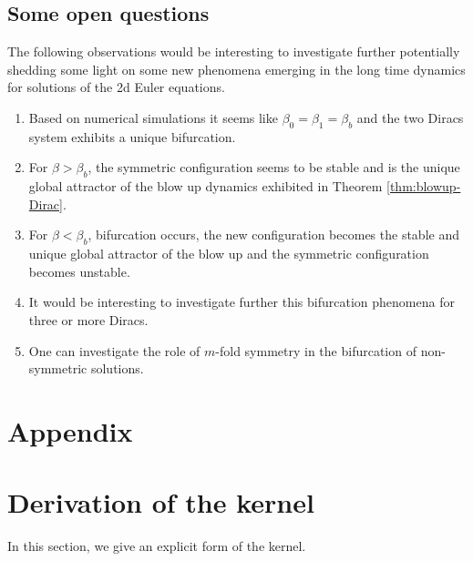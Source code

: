 \documentclass[10pt]{article}
\theoremstyle{definition}
\theoremstyle{remark}
\numberwithin{equation}{section}
\newcommand{\0}{\emptyset}
\begin{document}
\subsection{Some open questions}
The following observations would be interesting to investigate further potentially shedding some light on some new phenomena emerging in the long time dynamics for solutions of the 2d Euler equations.
\begin{enumerate}
    \item Based on numerical simulations it seems like $\beta_0=\beta_1=\beta_b$ and the two Diracs system exhibits a unique bifurcation.
    \item For $\beta> \beta_b$, the symmetric configuration seems to be stable and is the unique global attractor of the blow up dynamics exhibited in Theorem \ref{thm:blowup-Dirac}.
    \item For $\beta< \beta_b$, bifurcation occurs, the new configuration becomes the stable and unique global attractor of the blow up and the symmetric configuration becomes unstable.
    \item It would be interesting to investigate further this bifurcation phenomena for three or more Diracs. 
    \item One can investigate the role of $m$-fold symmetry in the bifurcation of non-symmetric solutions. 
\end{enumerate}
	
	\appendix
	
	
	\section*{Appendix}
	\section{Derivation of the kernel}

        In this section, we give an explicit form of the kernel. 
 
\end{document}
